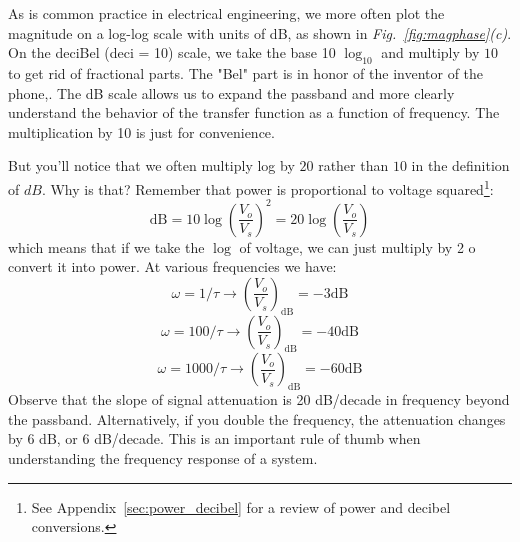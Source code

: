 As is common practice in electrical engineering, we more often plot the magnitude on a log-log scale with units of dB,  as shown in \emph{Fig.~\ref{fig:magphase}(c)}.  On the deciBel (deci = 10) scale, we take the base 10 $\log_{10}$ and multiply by $10$ to get rid of fractional parts.  The "Bel" part is in honor of the inventor of the phone,.  The dB scale allows us to expand the passband and more clearly understand the behavior of the transfer function as a function of frequency.  The multiplication by 10 is just for convenience.

But you'll notice that we often multiply log by $20$ rather than $10$ in the definition of $dB$.  Why is that?  Remember that power is proportional to voltage squared\footnote{See Appendix~\ref{sec:power_decibel} for a review of power and decibel conversions.}:
    \begin{equation}
        \mathrm{dB} = 10 \log\left( \frac{V_o}{V_s} \right)^2 = 20 \log\left( \frac{V_o}{V_s} \right)
    \end{equation}
which means that if we take the $\log$ of voltage, we can just multiply by 2 o convert it into power.
At various frequencies we have:
    \begin{equation}
        \omega = 1/\tau \rightarrow \left( \frac{V_o}{V_s} \right)_{\mathrm{dB}} = -3 \mathrm{dB}
    \end{equation}
    \begin{equation}
        \omega = 100/\tau \rightarrow \left( \frac{V_o}{V_s} \right)_{\mathrm{dB}} = -40 \mathrm{dB}
    \end{equation}
    \begin{equation}
        \omega = 1000/\tau \rightarrow \left( \frac{V_o}{V_s} \right)_{\mathrm{dB}} = -60 \mathrm{dB}
    \end{equation}
Observe that the slope of signal attenuation is 20 dB/decade in frequency beyond the passband.   Alternatively, if you double the frequency, the attenuation changes by 6 dB, or 6 dB/decade.  This is an important rule of thumb when understanding the frequency response of a system.
\newpage

